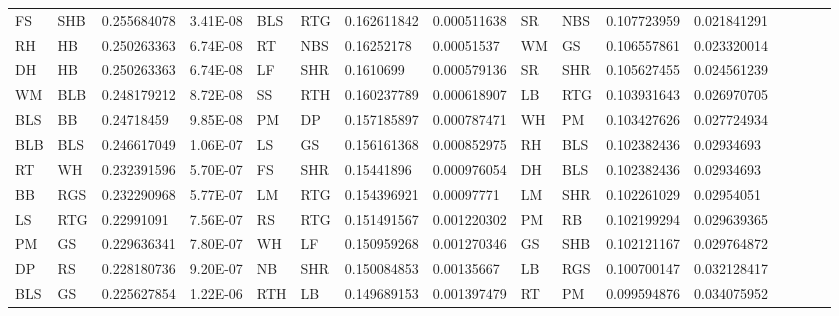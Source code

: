 \begin{table}[]
\begin{tabular}{llllllllllllllll}
FS  & SHB    & 0.255684078 & 3.41E-08 & BLS & RTG    & 0.162611842 & 0.000511638 & SR  & NBS    & 0.107723959 & 0.021841291 &     &        &              &             \\
RH  & HB     & 0.250263363 & 6.74E-08 & RT  & NBS    & 0.16252178  & 0.00051537  & WM  & GS     & 0.106557861 & 0.023320014 &     &        &              &             \\
DH  & HB     & 0.250263363 & 6.74E-08 & LF  & SHR    & 0.1610699   & 0.000579136 & SR  & SHR    & 0.105627455 & 0.024561239 &     &        &              &             \\
WM  & BLB    & 0.248179212 & 8.72E-08 & SS  & RTH    & 0.160237789 & 0.000618907 & LB  & RTG    & 0.103931643 & 0.026970705 &     &        &              &             \\
BLS & BB     & 0.24718459  & 9.85E-08 & PM  & DP     & 0.157185897 & 0.000787471 & WH  & PM     & 0.103427626 & 0.027724934 &     &        &              &             \\
BLB & BLS    & 0.246617049 & 1.06E-07 & LS  & GS     & 0.156161368 & 0.000852975 & RH  & BLS    & 0.102382436 & 0.02934693  &     &        &              &             \\
RT  & WH     & 0.232391596 & 5.70E-07 & FS  & SHR    & 0.15441896  & 0.000976054 & DH  & BLS    & 0.102382436 & 0.02934693  &     &        &              &             \\
BB  & RGS    & 0.232290968 & 5.77E-07 & LM  & RTG    & 0.154396921 & 0.00097771  & LM  & SHR    & 0.102261029 & 0.02954051  &     &        &              &             \\
LS  & RTG    & 0.22991091  & 7.56E-07 & RS  & RTG    & 0.151491567 & 0.001220302 & PM  & RB     & 0.102199294 & 0.029639365 &     &        &              &             \\
PM  & GS     & 0.229636341 & 7.80E-07 & WH  & LF     & 0.150959268 & 0.001270346 & GS  & SHB    & 0.102121167 & 0.029764872 &     &        &              &             \\
DP  & RS     & 0.228180736 & 9.20E-07 & NB  & SHR    & 0.150084853 & 0.00135667  & LB  & RGS    & 0.100700147 & 0.032128417 &     &        &              &             \\
BLS & GS     & 0.225627854 & 1.22E-06 & RTH & LB     & 0.149689153 & 0.001397479 & RT  & PM     & 0.099594876 & 0.034075952 &     &        &              &            
\end{tabular}
\end{table}